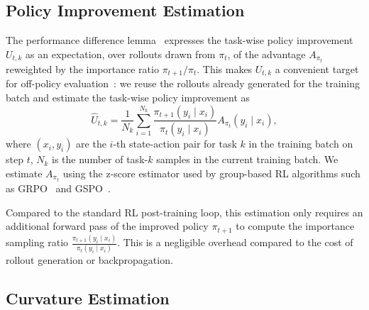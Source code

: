 \subsection{Policy Improvement Estimation}
\vspace{-0.05in}
The performance difference lemma~\citep{Kakade2002ApproximatelyOA} expresses the task-wise policy improvement $U_{t,k}$ as an expectation, over rollouts drawn from $\pi_t$, of the advantage $A_{\pi_t}$ reweighted by the importance ratio $\pi_{t+1}/\pi_t$. This makes $U_{t,k}$ a convenient target for off-policy evaluation~\citep{ope2000,gu2026actorcuratorcoadaptivecurriculumlearning}: we reuse the rollouts already generated for the training batch and estimate the task-wise policy improvement as
\begin{equation} \label{eq:policy_improvement_estimation}
\widehat U_{t,k}
=
\frac{1}{N_k}\sum_{i=1}^{N_k}
\frac{\pi_{t+1}(y_i\mid x_i)}
{\pi_{t}(y_i\mid x_i)}
A_{\pi_{t}}(y_i\mid x_i),
\end{equation}
where $(x_i, y_i)$ are the $i$-th state-action pair for task $k$ in the training batch on step $t$, $N_k$ is the number of task-$k$ samples in the current training batch. We estimate $A_{\pi_t}$ using the z-score estimator used by group-based RL algorithms such as GRPO~\citep{grpo2024} and GSPO~\citep{gspo2025}.

Compared to the standard RL post-training loop, this estimation only requires an additional forward pass of the improved policy $\pi_{t+1}$ to compute the importance sampling ratio $\frac{\pi_{t+1}(y_i\mid x_i)}{\pi_{t}(y_i\mid x_i)}$. This is a negligible overhead compared to the cost of rollout generation or backpropagation.



\subsection{Curvature Estimation}
\vspace{-0.05in}

